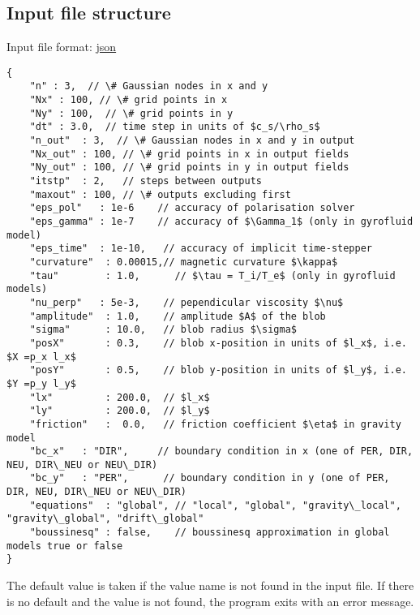 \subsection{Input file structure}
Input file format: \href{https://en.wikipedia.org/wiki/JSON}{json}
\begin{verbatim}
{
    "n" : 3,  // \# Gaussian nodes in x and y
    "Nx" : 100, // \# grid points in x
    "Ny" : 100,  // \# grid points in y
    "dt" : 3.0,  // time step in units of $c_s/\rho_s$
    "n_out"  : 3,  // \# Gaussian nodes in x and y in output
    "Nx_out" : 100, // \# grid points in x in output fields
    "Ny_out" : 100, // \# grid points in y in output fields
    "itstp"  : 2,   // steps between outputs
    "maxout" : 100, // \# outputs excluding first
    "eps_pol"   : 1e-6    // accuracy of polarisation solver
    "eps_gamma" : 1e-7    // accuracy of $\Gamma_1$ (only in gyrofluid model)
    "eps_time"  : 1e-10,   // accuracy of implicit time-stepper
    "curvature"  : 0.00015,// magnetic curvature $\kappa$
    "tau"        : 1.0,      // $\tau = T_i/T_e$ (only in gyrofluid models)
    "nu_perp"   : 5e-3,    // pependicular viscosity $\nu$
    "amplitude"  : 1.0,    // amplitude $A$ of the blob
    "sigma"      : 10.0,   // blob radius $\sigma$
    "posX"       : 0.3,    // blob x-position in units of $l_x$, i.e. $X =p_x l_x$
    "posY"       : 0.5,    // blob y-position in units of $l_y$, i.e. $Y =p_y l_y$
    "lx"         : 200.0,  // $l_x$
    "ly"         : 200.0,  // $l_y$
    "friction"   :  0.0,   // friction coefficient $\eta$ in gravity model
    "bc_x"   : "DIR",     // boundary condition in x (one of PER, DIR, NEU, DIR\_NEU or NEU\_DIR)
    "bc_y"   : "PER",      // boundary condition in y (one of PER, DIR, NEU, DIR\_NEU or NEU\_DIR)
    "equations"  : "global", // "local", "global", "gravity\_local", "gravity\_global", "drift\_global"
    "boussinesq" : false,    // boussinesq approximation in global models true or false
}
\end{verbatim}

The default value is taken if the value name is not found in the input file. If there is no default and
the value is not found,
the program exits with an error message.

